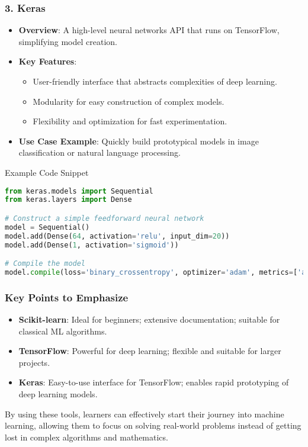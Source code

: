 \documentclass[aspectratio=169]{beamer}
\begin{document}
\begin{frame}[fragile]
    \frametitle{3. Keras}
    \begin{itemize}
        \item \textbf{Overview}: A high-level neural networks API that runs on TensorFlow, simplifying model creation.
        \item \textbf{Key Features}:
        \begin{itemize}
            \item User-friendly interface that abstracts complexities of deep learning.
            \item Modularity for easy construction of complex models.
            \item Flexibility and optimization for fast experimentation.
        \end{itemize}
        \item \textbf{Use Case Example}: Quickly build prototypical models in image classification or natural language processing.
    \end{itemize}

    \begin{block}{Example Code Snippet}
    \begin{lstlisting}[language=Python]
from keras.models import Sequential
from keras.layers import Dense

# Construct a simple feedforward neural network
model = Sequential()
model.add(Dense(64, activation='relu', input_dim=20))
model.add(Dense(1, activation='sigmoid'))

# Compile the model
model.compile(loss='binary_crossentropy', optimizer='adam', metrics=['accuracy'])
    \end{lstlisting}
    \end{block}
\end{frame}

\begin{frame}[fragile]
    \frametitle{Key Points to Emphasize}
    \begin{itemize}
        \item \textbf{Scikit-learn}: Ideal for beginners; extensive documentation; suitable for classical ML algorithms.
        \item \textbf{TensorFlow}: Powerful for deep learning; flexible and suitable for larger projects.
        \item \textbf{Keras}: Easy-to-use interface for TensorFlow; enables rapid prototyping of deep learning models.
    \end{itemize}

    By using these tools, learners can effectively start their journey into machine learning, allowing them to focus on solving real-world problems instead of getting lost in complex algorithms and mathematics.
\end{frame}
\end{document}
